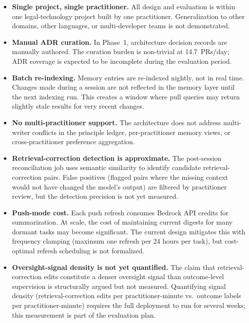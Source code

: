 \documentclass[11pt]{article}
\begin{document}
\begin{itemize}[leftmargin=*, nosep]
  \item \textbf{Single project, single practitioner.} All design and evaluation is within one legal-technology project built by one practitioner. Generalization to other domains, other languages, or multi-developer teams is not demonstrated.

  \item \textbf{Manual ADR curation.} In Phase~1, architecture decision records are manually authored. The curation burden is non-trivial at 14.7~PRs/day; ADR coverage is expected to be incomplete during the evaluation period.

  \item \textbf{Batch re-indexing.} Memory entries are re-indexed nightly, not in real time. Changes made during a session are not reflected in the memory layer until the next indexing run. This creates a window where pull queries may return slightly stale results for very recent changes.

  \item \textbf{No multi-practitioner support.} The architecture does not address multi-writer conflicts in the principle ledger, per-practitioner memory views, or cross-practitioner preference aggregation.

  \item \textbf{Retrieval-correction detection is approximate.} The post-session reconciliation job uses semantic similarity to identify candidate retrieval-correction pairs. False positives (flagged pairs where the missing context would not have changed the model's output) are filtered by practitioner review, but the detection precision is not yet measured.

  \item \textbf{Push-mode cost.} Each push refresh consumes Bedrock API credits for summarization. At scale, the cost of maintaining current digests for many dormant tasks may become significant. The current design mitigates this with frequency clamping (maximum one refresh per 24 hours per task), but cost-optimal refresh scheduling is not formalized.

  \item \textbf{Oversight-signal density is not yet quantified.} The claim that retrieval-correction edits constitute a denser oversight signal than outcome-level supervision is structurally argued but not measured. Quantifying signal density (retrieval-correction edits per practitioner-minute vs.\ outcome labels per practitioner-minute) requires the full deployment to run for several weeks; this measurement is part of the evaluation plan.
\end{itemize}
\end{document}
